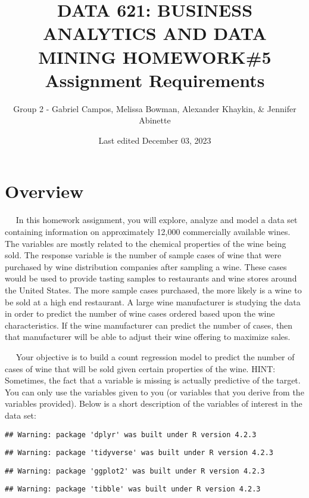 \documentclass[
]{article}
\title{DATA 621: BUSINESS ANALYTICS AND DATA MINING HOMEWORK\#5
Assignment Requirements}
\author{Group 2 - Gabriel Campos, Melissa Bowman, Alexander Khaykin, \&
Jennifer Abinette}
\date{Last edited December 03, 2023}
\begin{document}
\maketitle

{
\hypersetup{linkcolor=}
\setcounter{tocdepth}{4}
\tableofcontents
}
\hypertarget{overview}{%
\section{Overview}\label{overview}}

  In this homework assignment, you will explore, analyze and model a
data set containing information on approximately 12,000 commercially
available wines. The variables are mostly related to the chemical
properties of the wine being sold. The response variable is the number
of sample cases of wine that were purchased by wine distribution
companies after sampling a wine. These cases would be used to provide
tasting samples to restaurants and wine stores around the United States.
The more sample cases purchased, the more likely is a wine to be sold at
a high end restaurant. A large wine manufacturer is studying the data in
order to predict the number of wine cases ordered based upon the wine
characteristics. If the wine manufacturer can predict the number of
cases, then that manufacturer will be able to adjust their wine offering
to maximize sales.

  Your objective is to build a count regression model to predict the
number of cases of wine that will be sold given certain properties of
the wine. HINT: Sometimes, the fact that a variable is missing is
actually predictive of the target. You can only use the variables given
to you (or variables that you derive from the variables provided). Below
is a short description of the variables of interest in the data set:

\begin{verbatim}
## Warning: package 'dplyr' was built under R version 4.2.3
\end{verbatim}

\begin{verbatim}
## Warning: package 'tidyverse' was built under R version 4.2.3
\end{verbatim}

\begin{verbatim}
## Warning: package 'ggplot2' was built under R version 4.2.3
\end{verbatim}

\begin{verbatim}
## Warning: package 'tibble' was built under R version 4.2.3
\end{verbatim}
\end{document}
